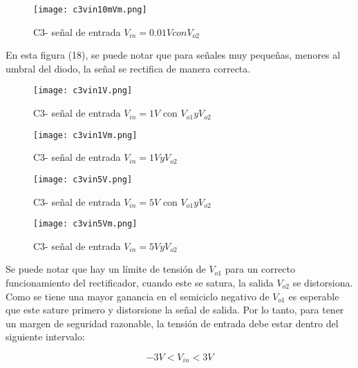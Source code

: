   \begin{figure}[h!]
     \centering
     \texttt{[image: c3vin10mVm.png]}
     \caption{C3- señal de entrada $V_{in} = 0.01V  con V_{o2}$}
     \label{fig:enter-label}
 \end{figure}
 
 En esta figura (18), se puede notar que para señales muy pequeñas, menores al umbral del diodo, la señal
se rectifica de manera correcta.
 
 \vspace{1em}

  \begin{figure}[h!]
     \centering
     \texttt{[image: c3vin1V.png]}
     \caption{C3- señal de entrada $V_{in} = 1V$ con $V_{o1} y V_{o2}$}
     \label{fig:enter-label}
 \end{figure}
 
  \begin{figure}[h!]
     \centering
     \texttt{[image: c3vin1Vm.png]}
     \caption{C3- señal de entrada $V_{in} = 1V  y V_{o2}$}
     \label{fig:enter-label}
 \end{figure}
 
 \vspace{1em}

  \begin{figure}[h!]
     \centering
     \texttt{[image: c3vin5V.png]}
     \caption{C3- señal de entrada $V_{in} = 5V$ con $V_{o1} y V_{o2}$}
     \label{fig:enter-label}
 \end{figure}
 
  \begin{figure}[h!]
     \centering
     \texttt{[image: c3vin5Vm.png]}
     \caption{C3- señal de entrada $V_{in} = 5V  y V_{o2}$}
     \label{fig:enter-label}
 \end{figure}
 
 \vspace{1em}
 
 Se puede notar que hay un límite de tensión de $ V_{o1} $ para un correcto funcionamiento
del rectificador, cuando este se satura, la salida $V_{o2} $  se distorsiona. Como se tiene una
mayor ganancia en el semiciclo negativo de $V_{o1} $  es esperable que este sature primero y
distorsione la señal de salida. Por lo tanto, para tener un margen de seguridad razonable,
la tensión de entrada debe estar dentro del siguiente intervalo:  

\[ -3V < V_{in} < 3V \]
 
